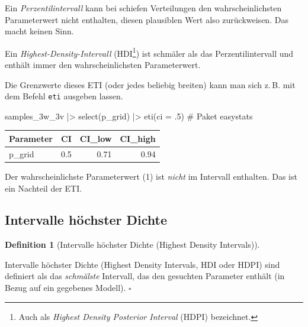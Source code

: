 \documentclass[
  ngerman,
  letterpaper,
  twoside,
  open=any]{scrbook}
\newenvironment{Shaded}{\begin{snugshade}}{\end{snugshade}}
\newcommand{\AttributeTok}[1]{\textcolor[rgb]{0.40,0.45,0.13}{#1}}
\newcommand{\CommentTok}[1]{\textcolor[rgb]{0.37,0.37,0.37}{#1}}
\newcommand{\DecValTok}[1]{\textcolor[rgb]{0.68,0.00,0.00}{#1}}
\newcommand{\FunctionTok}[1]{\textcolor[rgb]{0.28,0.35,0.67}{#1}}
\newcommand{\NormalTok}[1]{\textcolor[rgb]{0.00,0.23,0.31}{#1}}
\newcommand{\SpecialCharTok}[1]{\textcolor[rgb]{0.37,0.37,0.37}{#1}}
\newcounter{none} %
\theoremstyle{definition}
\theoremstyle{plain}
\theoremstyle{definition}
\theoremstyle{definition}
\newtheorem{definition}{Definition}[chapter]
\theoremstyle{definition}
\theoremstyle{definition}
\theoremstyle{remark}
\begin{document}
Ein \emph{Perzentilintervall} kann bei schiefen Verteilungen den
wahrscheinlichsten Parameterwert nicht enthalten, diesen plausiblen Wert
also zurückweisen. Das macht keinen Sinn.

Ein \emph{Highest-Density-Intervall} (HDI\footnote{Auch als
  \emph{Highest Density Posterior Interval} (HDPI) bezeichnet.}) ist
schmäler als das Perzentilintervall und enthält immer den
wahrscheinlichsten Parameterwert.

Die Grenzwerte dieses ETI (oder jedes beliebig breiten) kann man sich
z.\,B. mit dem Befehl \texttt{eti} ausgeben lassen.

\begin{Shaded}
\begin{Highlighting}[]
\NormalTok{samples\_3w\_3v }\SpecialCharTok{|\textgreater{}} 
  \FunctionTok{select}\NormalTok{(p\_grid) }\SpecialCharTok{|\textgreater{}} 
  \FunctionTok{eti}\NormalTok{(}\AttributeTok{ci =}\NormalTok{ .}\DecValTok{5}\NormalTok{)  }\CommentTok{\# Paket \textasciigrave{}easystats\textasciigrave{}}
\end{Highlighting}
\end{Shaded}

{\def\LTcaptype{none} %
\begin{longtable}[]{@{}lrrr@{}}
\toprule\noalign{}
Parameter & CI & CI\_low & CI\_high \\
\midrule\noalign{}
\endhead
\bottomrule\noalign{}
\endlastfoot
p\_grid & 0.5 & 0.71 & 0.94 \\
\end{longtable}
}

Der wahrscheinlichste Parameterwert (1) ist \emph{nicht} im Intervall
enthalten. Das ist ein Nachteil der ETI.

\subsection{Intervalle höchster
Dichte}\label{intervalle-huxf6chster-dichte}

\begin{definition}[Intervalle höchster Dichte (Highest Density
Intervals)]\protect\hypertarget{def-hdi}{}\label{def-hdi}

Intervalle höchster Dichte (Highest Density Intervals, HDI oder HDPI)
sind definiert als das \emph{schmälste} Intervall, das den gesuchten
Parameter enthält (in Bezug auf ein gegebenes Modell). \(\square\)

\end{definition}
\end{document}
